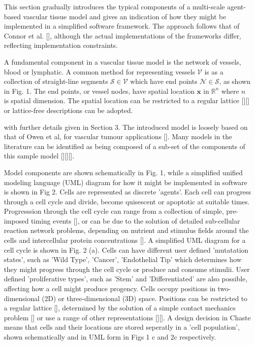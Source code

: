 \documentclass[superscriptaddress, a4paper]{article}
\begin{document}
This section gradually introduces the typical components of a multi-scale agent-based vascular tissue model and gives an indication of how they might be implemented in a simplified software framework. The approach follows that of Connor et al. [], although the actual implementations of the frameworks differ, reflecting implementation constraints.

A fundamental component in a vascular tissue model is the network of vessels, blood or lymphatic. A common method for representing vessels $\mathcal{V}$ is as a collection of straight-line segments $\mathcal{S} \in \mathcal{V}$ which have end points $\mathcal{N} \in \mathcal{S}$, as shown in Fig. 1. The end points, or vessel nodes, have spatial location $\mathbf{x}$ in $\mathbb{R}^n$ where $n$ is spatial dimension. The spatial location can be restricted to a regular lattice [][] or lattice-free descriptions can be adopted. 




with further details given in Section 3. The introduced model is loosely based on that of Owen et al, for vascular tumour applications []. Many models in the literature can be identified as being composed of a sub-set of the components of this sample model [][][]. 

Model components are shown schematically in Fig. 1, while a simplified unified modeling language (UML) diagram for how it might be implemented in software is shown in Fig 2. Cells are represented as discrete 'agents'. Each cell can progress through a cell cycle and divide, become quisescent or apoptotic at suitable times. Progresssion through the cell cycle can range from a collection of simple, pre-imposed timing events [], or can be due to the solution of detailed sub-cellular reaction network problems, depending on nutrient and stimulus fields around the cells and intercellular protein concentrations []. A simplified UML diagram for a cell cycle is shown in Fig. 2 (a). Cells can have different user defined 'mutatation states', such as 'Wild Type', 'Cancer', 'Endothelial Tip' which determines how they might progress through the cell cycle or produce and consume stimulii. User defined 'proliferative types', such as 'Stem' and 'Differentiated' are also possible, affecting how a cell might produce progency. Cells occupy positions in two-dimensional (2D) or three-dimensional (3D) space. Positions can be restricted to a regular lattice [], determined by the solution of a simple contact mechanics problem [] or use a range of other representations [][]. A design decision in Chaste means that cells and their locations are stored seperatly in a 'cell population', shown schematically and in UML form in Figs 1 c and 2c respectively.
\end{document}
